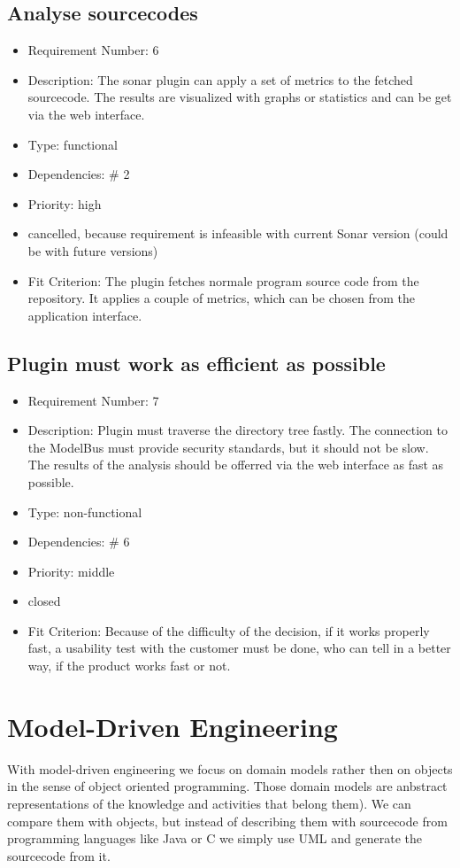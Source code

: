 \subsection{Analyse sourcecodes}
\begin{itemize}
\item Requirement Number: 6
\item Description: The sonar plugin can apply a set of metrics to the fetched sourcecode. The results are visualized with graphs or statistics and can be get via the web interface.
\item Type: functional
\item Dependencies: \# 2
\item Priority: high
\item cancelled, because requirement is infeasible with current Sonar version (could be with future versions)
\item Fit Criterion: The plugin fetches normale program source code from the repository. It applies a couple of metrics, which can be chosen from the application interface.
\end{itemize}

\subsection{Plugin must work as efficient as possible}
\begin{itemize}
\item Requirement Number: 7
\item Description: Plugin must traverse the directory tree fastly. The connection to the ModelBus must provide security standards, but it should not be slow. The results of the analysis should be offerred via the web interface as fast as possible.
\item Type: non-functional
\item Dependencies: \# 6
\item Priority: middle
\item closed
\item Fit Criterion: Because of the difficulty of the decision, if it works properly fast, a usability test with the customer must be done, who can tell in a better way, if the product works fast or not.
\end{itemize}

\section{Model-Driven Engineering}
With model-driven engineering we focus on domain models rather then on objects in the sense of object oriented programming. Those domain models are anbstract representations of the knowledge and activities that belong them). We can compare them with objects, but instead of describing them with sourcecode from programming languages like Java or C we simply use UML and generate the sourcecode from it.

